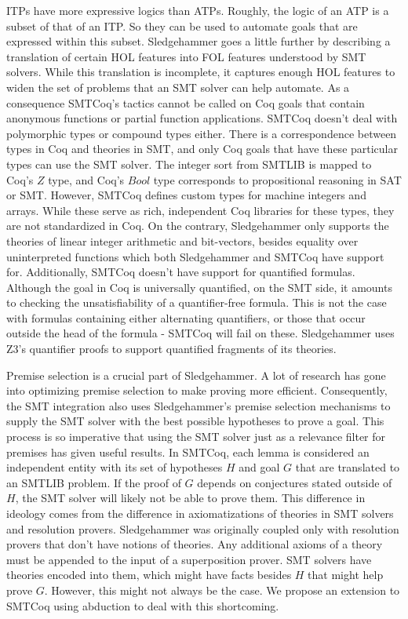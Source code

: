 \documentclass{article}
\begin{document}
	ITPs have more expressive logics than ATPs. Roughly, the 
	logic of an ATP is a subset of that of an ITP. So they 
	can be used to automate goals that are expressed within 
	this subset. Sledgehammer goes a little further by 
	describing a translation of certain HOL features 
	into FOL features understood by SMT solvers. While this 
	translation is incomplete, it captures enough HOL features 
	to widen the set of problems that an SMT solver can 
	help automate. As a consequence SMTCoq's tactics 
	cannot be called on Coq goals that contain anonymous 
	functions or partial function applications. 
	SMTCoq doesn't deal with polymorphic types 
	or compound types either. There is a correspondence between 
	types in Coq and theories in SMT, and only Coq 
	goals that have these particular types can use the 
	SMT solver. The integer sort from SMTLIB is mapped to Coq's 
	$Z$ type, and Coq's $Bool$ type corresponds to propositional 
	reasoning in SAT or SMT. However, SMTCoq defines custom types 
	for machine integers and arrays. While these serve as rich,
	independent Coq libraries for these types, they are 
	not standardized in Coq. On the contrary, Sledgehammer 
	only supports the theories of linear integer arithmetic
	and bit-vectors, besides equality over uninterpreted functions
	which both Sledgehammer and SMTCoq have support for. 
	Additionally, SMTCoq doesn't have support for quantified 
	formulas. Although the goal in Coq is universally 
	quantified, on the SMT side, it amounts to checking the 
	unsatisfiability of a quantifier-free formula. This is not 
	the case with formulas containing either alternating 
	quantifiers, or those that occur outside the head of the 
	formula - SMTCoq will fail on these. Sledgehammer uses 
	Z3's quantifier proofs to support quantified fragments of 
	its theories.
	
	Premise selection is a crucial part of Sledgehammer. A lot 
	of research has gone into optimizing premise selection to 
	make proving more efficient. Consequently, the SMT 
	integration also uses Sledgehammer's premise selection 
	mechanisms to supply the SMT solver with the best 
	possible hypotheses to prove a goal. This process is 
	so imperative that using the SMT solver just as a 
	relevance filter for premises has given useful 
	results. In SMTCoq, each lemma is considered an 
	independent entity with its set of hypotheses $H$ and 
	goal $G$ that are translated to an SMTLIB problem. 
	If the proof of $G$ depends on conjectures stated
	outside of $H$, the SMT solver will likely not be 
	able to prove them. This difference in 
	ideology comes from the difference in axiomatizations
	of theories in SMT solvers and resolution provers. 
	Sledgehammer was originally coupled only 
	with resolution provers that don't have notions of 
	theories. Any additional axioms of a theory 
	must be appended to the input of a superposition 
	prover. SMT solvers have theories encoded into them, 
	which might have facts besides $H$ that might help 
	prove $G$. However, this might not always be the case.
	We propose an extension to SMTCoq using abduction 
	to deal with this shortcoming.
	
\end{document}
